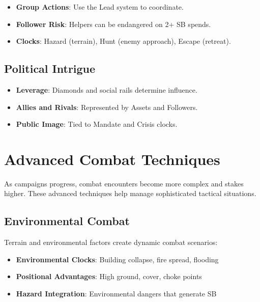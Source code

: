 \begin{itemize}
    \item \textbf{Group Actions}: Use the Lead system to coordinate.
    \item \textbf{Follower Risk}: Helpers can be endangered on 2+ SB spends.
    \item \textbf{Clocks}: Hazard (terrain), Hunt (enemy approach), Escape (retreat).
\end{itemize}

\subsection*{Political Intrigue}

\begin{itemize}
    \item \textbf{Leverage}: Diamonds and social rails determine influence.
    \item \textbf{Allies and Rivals}: Represented by Assets and Followers.
    \item \textbf{Public Image}: Tied to Mandate and Crisis clocks.
\end{itemize}

\section*{Advanced Combat Techniques}

As campaigns progress, combat encounters become more complex and stakes higher. These advanced techniques help manage sophisticated tactical situations.

\subsection*{Environmental Combat}

Terrain and environmental factors create dynamic combat scenarios:

\begin{itemize}
    \item \textbf{Environmental Clocks}: Building collapse, fire spread, flooding
    \item \textbf{Positional Advantages}: High ground, cover, choke points
    \item \textbf{Hazard Integration}: Environmental dangers that generate SB
\end{itemize}

